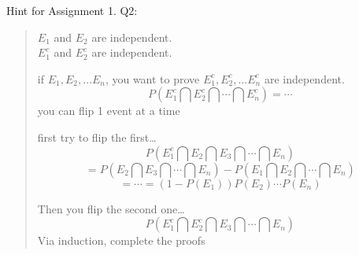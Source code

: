 Hint for Assignment 1. Q2:
\begin{quote}
    $E_1$ and $E_2$ are independent.
    \\$E_1^c$ and $E_2^c$ are independent.

    if $E_1, E_2, \dots E_n$, you want to prove $E_1^c, E_2^c, \dots E_n^c$ are independent.
    \[P(E_1^c \bigcap E_2^c \bigcap \cdots \bigcap E_n^c) = \cdots\]
    you can flip 1 event at a time

    first try to flip the first\dots
    \[P(E_1^c \bigcap E_2 \bigcap E_3 \bigcap \cdots \bigcap E_n)\]
    \[= P(E_2 \bigcap E_3 \bigcap \cdots \bigcap E_n) - P(E_1 \bigcap E_2 \bigcap \cdots \bigcap E_n)\]
    \[ = \cdots = (1-P(E_1))P(E_2)\cdots P(E_n)\]

    Then you flip the second one\dots
    \[P(E_1^c \bigcap E_2^c \bigcap E_3 \bigcap \cdots \bigcap E_n)\]
    Via induction, complete the proofs
\end{quote}
